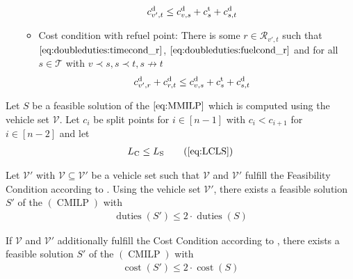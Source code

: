 \begin{definition}[Conditions]
\begin{enumerate}
\begin{itemize}
			\begin{align}
				c^{\operatorname{d}}_{v',t} & \leq c^{\operatorname{d}}_{v,s} + c^{\operatorname{t}}_s + c^{\operatorname{d}}_{s,t} \label{eq:doubleduties:costcond}
			\end{align}
		\item Cost condition with refuel point: There is some ${r\in\mathcal{R}_{v',t}}$ such that $\eqref{eq:doubleduties:timecond_r}$, $\eqref{eq:doubleduties:fuelcond_r}$ and for all $s\in\mathcal{T}$ with ${v\prec s, s\prec t, s\not\to t}$
			\begin{align}
				c^{\operatorname{d}}_{v',r} + c^{\operatorname{d}}_{r,t} & \leq c^{\operatorname{d}}_{v,s} + c^{\operatorname{t}}_s + c^{\operatorname{d}}_{s,t} \label{eq:doubleduties:costcond_r}
			\end{align}
	\end{itemize}
\end{enumerate}

\end{definition}

\begin{theorem}

Let $S$ be a feasible solution of the $\eqref{eq:MMILP}$ which is computed using the vehicle set $\mathcal{V}$. Let $c_i$ be split points for $i\in[n-1]$ with ${c_i<c_{i+1}}$ for ${i\in[n-2]}$ and let
\begin{align}
	L_{\operatorname{C}} \leq L_{\operatorname{S}} \tag{\ref{eq:LCLS}}
\end{align}

Let $\mathcal{V}'$ with $\mathcal{V}\subseteq\mathcal{V}'$ be a vehicle set such that $\mathcal{V}$ and $\mathcal{V}'$ fulfill the Feasibility Condition according to . Using the vehicle set $\mathcal{V}'$, there exists a feasible solution $S'$ of the $(\operatorname{CMILP})$ with
\begin{align}
	\operatorname{duties}\left(S'\right) \leq 2\cdot\operatorname{duties}\left(S\right)
\end{align}

If $\mathcal{V}$ and $\mathcal{V}'$ additionally fulfill the Cost Condition according to , there exists a feasible solution $S'$ of the $(\operatorname{CMILP})$ with
\begin{align}
	\operatorname{cost}\left(S'\right) \leq 2\cdot\operatorname{cost}\left(S\right)
\end{align}

\end{theorem}

